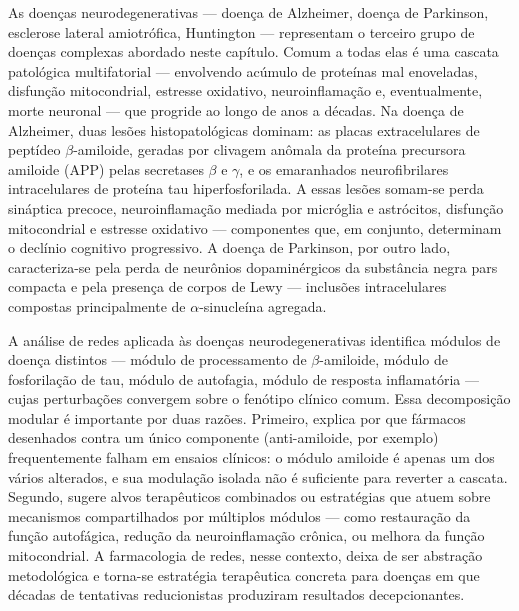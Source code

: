 As doenças neurodegenerativas --- doença de Alzheimer, doença de Parkinson, esclerose lateral amiotrófica, Huntington --- representam o terceiro grupo de doenças complexas abordado neste capítulo. Comum a todas elas é uma cascata patológica multifatorial --- envolvendo acúmulo de proteínas mal enoveladas, disfunção mitocondrial, estresse oxidativo, neuroinflamação e, eventualmente, morte neuronal --- que progride ao longo de anos a décadas. Na doença de Alzheimer, duas lesões histopatológicas dominam: as placas extracelulares de peptídeo $\beta$-amiloide, geradas por clivagem anômala da proteína precursora amiloide (APP) pelas secretases $\beta$ e $\gamma$, e os emaranhados neurofibrilares intracelulares de proteína tau hiperfosforilada. A essas lesões somam-se perda sináptica precoce, neuroinflamação mediada por micróglia e astrócitos, disfunção mitocondrial e estresse oxidativo --- componentes que, em conjunto, determinam o declínio cognitivo progressivo. A doença de Parkinson, por outro lado, caracteriza-se pela perda de neurônios dopaminérgicos da substância negra pars compacta e pela presença de corpos de Lewy --- inclusões intracelulares compostas principalmente de $\alpha$-sinucleína agregada.

A análise de redes aplicada às doenças neurodegenerativas identifica módulos de doença distintos --- módulo de processamento de $\beta$-amiloide, módulo de fosforilação de tau, módulo de autofagia, módulo de resposta inflamatória --- cujas perturbações convergem sobre o fenótipo clínico comum. Essa decomposição modular é importante por duas razões. Primeiro, explica por que fármacos desenhados contra um único componente (anti-amiloide, por exemplo) frequentemente falham em ensaios clínicos: o módulo amiloide é apenas um dos vários alterados, e sua modulação isolada não é suficiente para reverter a cascata. Segundo, sugere alvos terapêuticos combinados ou estratégias que atuem sobre mecanismos compartilhados por múltiplos módulos --- como restauração da função autofágica, redução da neuroinflamação crônica, ou melhora da função mitocondrial. A farmacologia de redes, nesse contexto, deixa de ser abstração metodológica e torna-se estratégia terapêutica concreta para doenças em que décadas de tentativas reducionistas produziram resultados decepcionantes.



